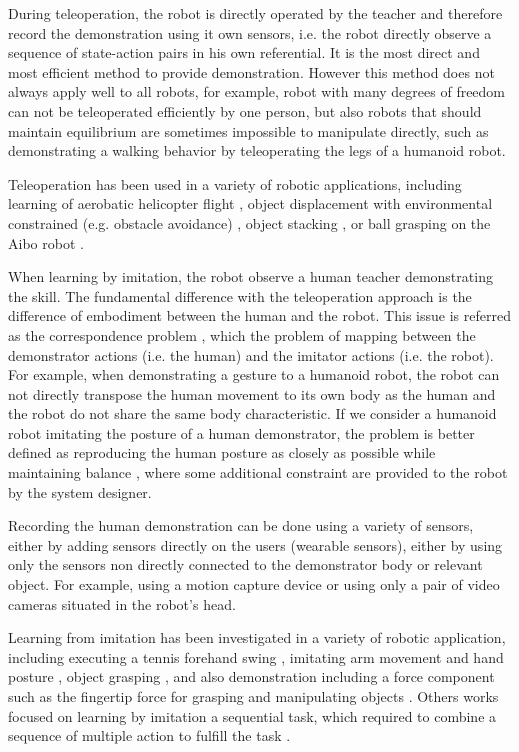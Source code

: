 During teleoperation, the robot is directly operated by the teacher and therefore record the demonstration using it own sensors, i.e. the robot directly observe a sequence of state-action pairs in his own referential. It is the most direct and most efficient method to provide demonstration. However this method does not always apply well to all robots, for example, robot with many degrees of freedom can not be teleoperated efficiently by one person, but also robots that should maintain equilibrium are sometimes impossible to manipulate directly, such as demonstrating a walking behavior by teleoperating the legs of a humanoid robot.

Teleoperation has been used in a variety of robotic applications, including learning of aerobatic helicopter flight \cite{abbeel2007application}, object displacement with environmental constrained (e.g. obstacle avoidance) \cite{guenter2007reinforcement,calinon2007teacher}, object stacking \cite{calinon2007teacher}, or ball grasping on the Aibo robot \cite{grollman2007learning}.

When learning by imitation, the robot observe a human teacher demonstrating the skill. The fundamental difference with the teleoperation approach is the difference of embodiment between the human and the robot. This issue is referred as the correspondence problem \cite{nehaniv2002correspondence}, which the problem of mapping between the demonstrator actions (i.e. the human) and the imitator actions (i.e. the robot). For example, when demonstrating a gesture to a humanoid robot, the robot can not directly transpose the human movement to its own body as the human and the robot do not share the same body characteristic. If we consider a humanoid robot imitating the posture of a human demonstrator, the problem is better defined as reproducing the human posture as closely as possible while maintaining balance \cite{hyon2007full,yamane2009simultaneous}, where some additional constraint are provided to the robot by the system designer.

Recording the human demonstration can be done using a variety of sensors, either by adding sensors directly on the users (wearable sensors), either by using only the sensors non directly connected to the demonstrator body or relevant object. For example, using a motion capture device or using only a pair of video cameras situated in the robot's head.

Learning from imitation has been investigated in a variety of robotic application, including executing a tennis forehand swing \cite{ijspeert2002movement}, imitating arm movement \cite{billard2001learning} and hand posture \cite{chella2004posture}, object grasping \cite{lopes2005visual,tegin2009demonstration}, and also demonstration including a force component such as the fingertip force for grasping and manipulating objects \cite{lin2012learning}. Others works focused on learning by imitation a sequential task, which required to combine a sequence of multiple action to fulfill the task \cite{pardowitz2005learning,natarajan2011imitation}.

